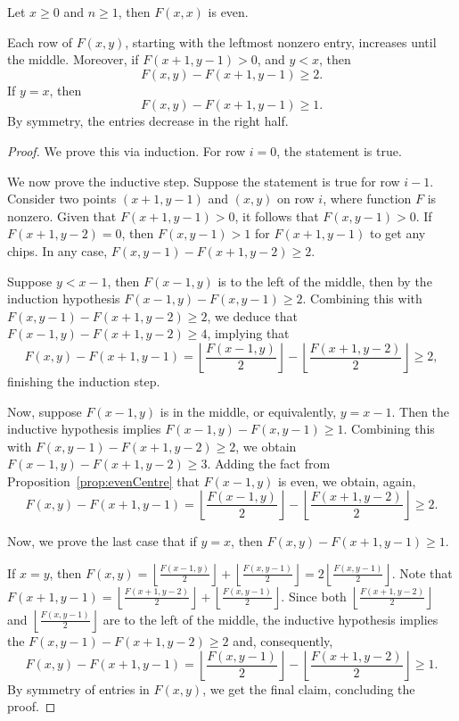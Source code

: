 \documentclass[10pt,a4paper]{amsart}
\newcommand{\floor}[1]{\left\lfloor #1 \right\rfloor}
\begin{document}
\begin{proposition}
\label{prop:evenCentre}
    Let $x \geq 0$ and $n \geq 1$, then $F(x, x)$ is even.
\end{proposition}

\begin{proposition}\label{prop:IncreaseUntilMiddle}
    Each row of $F(x,y)$, starting with the leftmost nonzero entry, increases until the middle. Moreover, if $F(x+1,y-1) > 0$, and $y < x$, then
    \begin{equation}F(x, y) - F(x+1, y-1) \ge 2.\end{equation}
    If $y = x$, then
    \begin{equation}F(x, y) - F(x+1, y-1) \ge 1.\end{equation}
    By symmetry, the entries decrease in the right half.
\end{proposition}

\begin{proof}
We prove this via induction. For row $i=0$, the statement is true.

We now prove the inductive step. Suppose the statement is true for row $i-1$. Consider two points $(x+1,y-1)$ and $(x,y)$ on row $i$, where function $F$ is nonzero. Given that $F(x+1,y-1) > 0$, it follows that $F(x, y-1) > 0$. If $F(x+1, y-2) = 0$, then $F(x, y-1) > 1$ for $F(x+1,y-1)$ to get any chips. In any case, $F(x, y-1) - F(x+1, y-2) \ge 2$.

Suppose $y < x-1$, then $F(x-1, y)$ is to the left of the middle, then by the induction hypothesis $ F(x-1, y) - F(x, y-1) \ge 2$. Combining this with $F(x, y-1) - F(x+1, y-2) \ge 2$, we deduce that $F(x-1, y) - F(x+1, y-2) \ge 4$, implying that
\[F(x, y) - F(x+1, y-1) = \floor{\frac{F(x-1, y)}{2}} - \floor{\frac{F(x+1, y-2)}{2}} \ge 2,\]
finishing the induction step.

Now, suppose $F(x-1, y)$ is in the middle, or equivalently, $y = x-1$. Then the inductive hypothesis implies $F(x-1, y)- F(x, y-1) \ge 1$. Combining this with $F(x, y-1) - F(x+1, y-2) \ge 2$, we obtain $F(x-1, y) - F(x+1, y-2) \ge 3$. Adding the fact from Proposition~\ref{prop:evenCentre} that $F(x-1, y)$ is even, we obtain, again, 
\[F(x, y) - F(x+1, y-1) = \floor{\frac{F(x-1, y)}{2}} - \floor{\frac{F(x+1, y-2)}{2}} \ge 2.\]

Now, we prove the last case that if $y = x$, then $F(x, y) - F(x+1, y-1) \ge 1$.

If $x=y$, then $F(x, y) = \floor{\frac{F(x-1, y)}{2}} + \floor{\frac{F(x, y-1)}{2}} = 2\floor{\frac{F(x, y-1)}{2}}$. Note that $F(x+1, y-1) = \floor{\frac{F(x+1, y-2)}{2}} + \floor{\frac{F(x, y-1)}{2}}$. Since both $\floor{\frac{F(x+1, y-2)}{2}}$ and $\floor{\frac{F(x, y-1)}{2}}$ are to the left of the middle, the inductive hypothesis implies the $F(x, y-1) - F(x+1, y-2) \ge 2$ and, consequently,
\[F(x ,y) - F(x+1, y-1) = \floor{\frac{F(x, y-1)}{2}} - \floor{\frac{F(x+1, y-2)}{2}} \ge 1.\]
By symmetry of entries in $F(x,y)$, we get the final claim, concluding the proof.
\end{proof}
\end{document}
